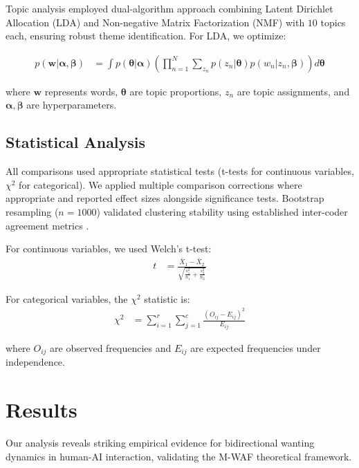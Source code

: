 \documentclass{article}
\begin{document}
Topic analysis employed dual-algorithm approach combining Latent Dirichlet Allocation (LDA) and Non-negative Matrix Factorization (NMF) with $10$ topics each, ensuring robust theme identification. For LDA, we optimize:

\begin{align}
p(\mathbf{w}|\boldsymbol{\alpha}, \boldsymbol{\beta}) &= \int p(\boldsymbol{\theta}|\boldsymbol{\alpha}) \left(\prod_{n=1}^{N} \sum_{z_n} p(z_n|\boldsymbol{\theta}) p(w_n|z_n, \boldsymbol{\beta})\right) d\boldsymbol{\theta} \label{eq:lda}
\end{align}

where $\mathbf{w}$ represents words, $\boldsymbol{\theta}$ are topic proportions, $z_n$ are topic assignments, and $\boldsymbol{\alpha}, \boldsymbol{\beta}$ are hyperparameters.

\subsection{Statistical Analysis}

All comparisons used appropriate statistical tests (t-tests for continuous variables, $\chi^2$ for categorical). We applied multiple comparison corrections where appropriate and reported effect sizes alongside significance tests. Bootstrap resampling ($n=1000$) validated clustering stability using established inter-coder agreement metrics \citep{landis1977measurement}.

For continuous variables, we used Welch's t-test:
\begin{align}
t &= \frac{\bar{X}_1 - \bar{X}_2}{\sqrt{\frac{s_1^2}{n_1} + \frac{s_2^2}{n_2}}} \label{eq:ttest}
\end{align}

For categorical variables, the $\chi^2$ statistic is:
\begin{align}
\chi^2 &= \sum_{i=1}^{r} \sum_{j=1}^{c} \frac{(O_{ij} - E_{ij})^2}{E_{ij}} \label{eq:chisquare}
\end{align}

where $O_{ij}$ are observed frequencies and $E_{ij}$ are expected frequencies under independence.

\section{Results}
Our analysis reveals striking empirical evidence for bidirectional wanting dynamics in human-AI interaction, validating the M-WAF theoretical framework.
\end{document}
